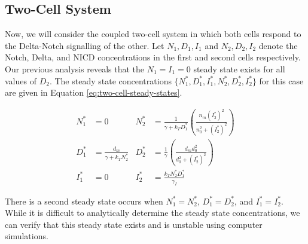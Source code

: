 \documentclass{article}
\begin{document}
\begin{flushleft}
\subsection*{Two-Cell System}

Now, we will consider the coupled two-cell system in which both cells respond to the Delta-Notch signalling of the other. Let $N_{1}, D_{1}, I_{1}$ and $N_{2}, D_{2}, I_{2}$ denote the Notch, Delta, and NICD concentrations in the first and second cells respectively. Our previous analysis reveals that the $N_{1} = I_{1} = 0$ steady state exists for all values of $D_{2}$. The steady state concentrations $\{ N_{1}^{*}, D_{1}^{*}, I_{1}^{*}, N_{2}^{*}, D_{2}^{*}, I_{2}^{*} \}$ for this case are given in Equation \ref{eq:two-cell-steady-states}.

\begin{equation}
\label{eq:two-cell-steady-states}
\begin{aligned}
  N_{1}^{*} &= 0  &
  N_{2}^{*} &= \frac{1}{\gamma + k_{T}D_{1}^{*}}\left( \frac{n_{m}(I_{2}^{*})^2}{n_{0}^2 + (I_{2}^{*})^2} \right)  \\[5pt]
  D_{1}^{*} &= \frac{d_{m}}{\gamma + k_{T}N_{2}^{*}} &
  D_{2}^{*} &= \frac{1}{\gamma} \left( \frac{d_{m}d_{0}^2}{d_{0}^2 + (I_{2}^{*})^2} \right)  \\[5pt]
  I_{1}^{*} &= 0 &
  I_{2}^{*} &= \frac{k_{T}N_{2}^{*}D_{1}^{*}}{\gamma_{I}}
\end{aligned}
\end{equation}

There is a second steady state occurs when $N_{1}^{*} = N_{2}^{*}$, $D_{1}^{*} = D_{2}^{*}$, and $I_{1}^{*} = I_{2}^{*}$. While it is difficult to analytically determine the steady state concentrations, we can verify that this steady state exists and is unstable using computer simulations.

\end{flushleft}
\end{document}
